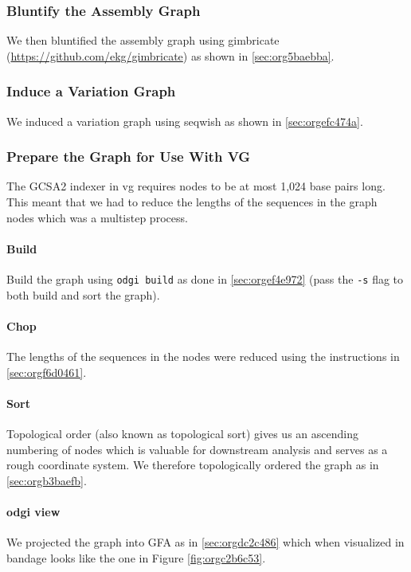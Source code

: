 \documentclass[10pt, a4paper]{article}
\begin{document}
\subsubsection{Bluntify the Assembly Graph}
\label{sec:org7b71dd2}
We then bluntified the assembly graph 
using gimbricate (\url{https://github.com/ekg/gimbricate}) as shown in
\ref{sec:org5baebba}.

\subsubsection{Induce a Variation Graph}
\label{sec:orga88cc88}
We induced a variation graph using seqwish as shown in \ref{sec:orgefc474a}.

\subsubsection{Prepare the Graph for Use With VG}
\label{sec:orgff39724}
The GCSA2  indexer in vg requires nodes to be at
most 1,024 base pairs long.
This meant that we had to reduce the lengths of the sequences in the graph nodes
which was a multistep process.

\paragraph{Build}
\label{sec:orgf7e72c9}
Build the graph using \texttt{odgi build} as done in \ref{sec:orgef4e972}
(pass the \texttt{-s} flag to both build and sort the graph).

\paragraph{Chop}
\label{sec:orgaa44164}
The lengths of the sequences in the nodes were reduced using the instructions in
\ref{sec:orgf6d0461}.

\paragraph{Sort}
\label{sec:org1b4e9dd}
Topological order (also known as topological sort) gives us an ascending numbering of nodes which is 
valuable for downstream analysis and serves as a rough coordinate system.
We therefore topologically ordered the graph as in \ref{sec:orgb3baefb}.

\paragraph{odgi view}
\label{sec:org1c056a2}
We projected the graph into GFA as in \ref{sec:orgdc2c486} which when visualized in
bandage looks like the one in Figure \ref{fig:orgc2b6c53}.
\end{document}
